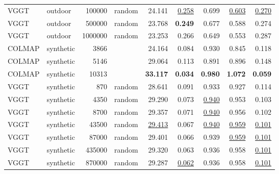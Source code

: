 \begin{table}[H]
\begin{tabular}{llrlrrrrr}
VGGT & outdoor & 100000 & random & 24.141 & \underline{0.258} & 0.699 & \underline{0.603} & \underline{0.270} \\
VGGT & outdoor & 500000 & random & 23.768 & \textbf{0.249} & 0.677 & 0.588 & 0.274 \\
VGGT & outdoor & 1000000 & random & 23.253 & 0.266 & 0.649 & 0.553 & 0.287 \\
\midrule
COLMAP & synthetic & 3866 &  & 24.164 & 0.084 & 0.930 & 0.845 & 0.118 \\
COLMAP & synthetic & 5146 &  & 29.064 & 0.113 & 0.891 & 0.896 & 0.148 \\
COLMAP & synthetic & 10313 &  & \textbf{33.117} & \textbf{0.034} & \textbf{0.980} & \textbf{1.072} & \textbf{0.059} \\
VGGT & synthetic & 870 & random & 28.641 & 0.091 & 0.933 & 0.927 & 0.114 \\
VGGT & synthetic & 4350 & random & 29.290 & 0.073 & \underline{0.940} & 0.953 & 0.103 \\
VGGT & synthetic & 8700 & random & 29.357 & 0.071 & \underline{0.940} & 0.956 & 0.102 \\
VGGT & synthetic & 43500 & random & \underline{29.413} & 0.067 & \underline{0.940} & \underline{0.959} & \underline{0.101} \\
VGGT & synthetic & 87000 & random & 29.401 & 0.066 & 0.939 & \underline{0.959} & \underline{0.101} \\
VGGT & synthetic & 435000 & random & 29.320 & 0.063 & 0.936 & 0.958 & \underline{0.101} \\
VGGT & synthetic & 870000 & random & 29.287 & \underline{0.062} & 0.936 & 0.958 & \underline{0.101} \\
\bottomrule
\end{tabular}
\end{table}